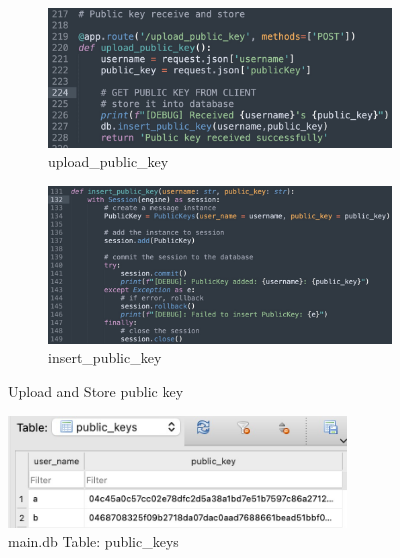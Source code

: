 \documentclass[12pt]{article}
\begin{document}
\begin{enumerate}
            \begin{figure}[H]
                \centering
                \begin{subfigure}[b]{0.45\textwidth}
                    \centering
                    \includegraphics[width=\textwidth]{graphs/upload_public_key.jpg}
                    \caption{upload\_public\_key}
                \end{subfigure}
                \hfill 
                \begin{subfigure}[b]{0.45\textwidth}
                    \centering
                    \includegraphics[width=\textwidth]{graphs/insert_public_key.jpg}
                    \caption{insert\_public\_key}
                \end{subfigure}
                \caption{Upload and Store public key}
                \label{Upload and Store public key}
            \end{figure}

            \begin{figure}[H]
                \centering
                \includegraphics[width=0.8\textwidth]{graphs/db_public_key.jpg}
                \caption{main.db Table: public\_keys}
                \label{db public_key}
            \end{figure}


\end{enumerate}
\end{document}
